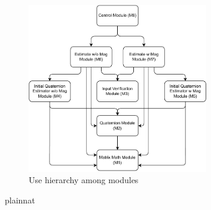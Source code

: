 \documentclass[12pt, titlepage]{article}
\begin{document}
\begin{figure}[H]
\centering
\includegraphics[width=0.7\textwidth]{uses_diagram.pdf}
\caption{Use hierarchy among modules}
\label{FigUH}
\end{figure}









 {plainnat}


\newpage{}
\end{document}
